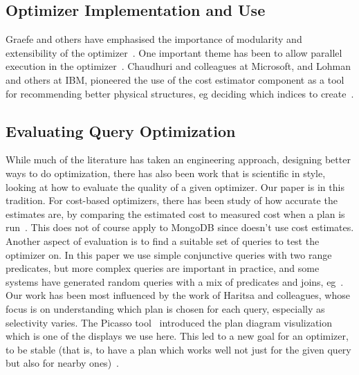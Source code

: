 
\subsection{Optimizer Implementation and Use}
Graefe and others have emphasised the importance of modularity and extensibility of the optimizer~\cite{Graefe94, Graefe95a}. One important theme has been to allow parallel execution in the optimizer~\cite{WaasH09, SolimanAREGSCGRPWNKB14}. 
Chaudhuri and colleagues at Microsoft, and Lohman and others at IBM, pioneered the use of the cost estimator component as a tool for recommending better physical structures, eg deciding which indices to create~\cite{Chaudhuri:1998478, Chaudhuri:20049cd, Valentin:20005d5, Agrawal:2005dff, chaudhuri2008pay}. 

\subsection{Evaluating Query Optimization}
While much of the literature has taken an engineering approach, designing better ways to do optimization, there has also been work that is scientific in style, looking at how to evaluate the quality of a given optimizer. Our paper is in this tradition. For cost-based optimizers, there has been study of how accurate the estimates are, by comparing the estimated cost to measured cost when a plan is run~\cite{GuSW12, LeisGMBK015}. This does not of course apply to MongoDB since \approachName doesn't use cost estimates. Another aspect of evaluation is to find a suitable set of queries to test the optimizer on. In this paper we use simple conjunctive queries with two range predicates, but more complex queries are important in practice, and some systems have generated random queries with a mix of predicates and joins, eg~\cite{StillgerF95, WaasG00}. Our work has been most influenced by the work of Haritsa and colleagues, whose focus is on understanding which plan is chosen for each query, especially as selectivity varies. The Picasso tool~\cite{reddy2005analyzing, Haritsa10} introduced the plan diagram visulization which is one of the displays we use here. This led to a new goal for an optimizer, to be stable (that is, to have a plan which works well not just for the given query but also for nearby ones)~\cite{AbhiramaBDSH10}.

